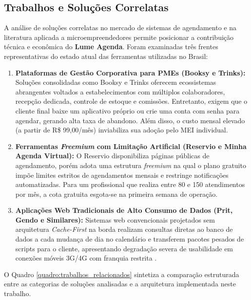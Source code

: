\documentclass[12pt,a4paper]{article}
\begin{document}

\subsection{Trabalhos e Soluções Correlatas}
\label{subsec:trabalhos_correlatos}

A análise de soluções correlatas no mercado de sistemas de agendamento e na literatura aplicada a microempreendedores permite posicionar a contribuição técnica e econômica do \textbf{Lume Agenda}. Foram examinadas três frentes representativas do estado atual das ferramentas utilizadas no Brasil:

\begin{enumerate}
    \item \textbf{Plataformas de Gestão Corporativa para PMEs (Booksy e Trinks):} Soluções consolidadas como Booksy \cite{booksy_br, booksy_pricing} e Trinks \cite{trinks_planos, trinks_home} oferecem ecossistemas abrangentes voltados a estabelecimentos com múltiplos colaboradores, recepção dedicada, controle de estoque e comissões. Entretanto, exigem que o cliente final baixe um aplicativo próprio ou crie uma conta com senha para agendar, gerando alta taxa de abandono. Além disso, o custo mensal elevado (a partir de R\$ 99,00/mês) inviabiliza sua adoção pelo MEI individual.
    \item \textbf{Ferramentas \textit{Freemium} com Limitação Artificial (Reservio e Minha Agenda Virtual):} O Reservio \cite{reservio_br, reservio_pt} disponibiliza páginas públicas de agendamento, porém adota uma estrutura \textit{freemium} na qual o plano gratuito impõe limites estritos de agendamentos mensais e restringe notificações automatizadas. Para um profissional que realiza entre 80 e 150 atendimentos por mês, a cota gratuita esgota-se na primeira semana de operação.
    \item \textbf{Aplicações Web Tradicionais de Alto Consumo de Dados (Prit, Gendo e Similares):} Sistemas web convencionais projetados sem arquitetura \textit{Cache-First} na borda realizam consultas diretas ao banco de dados a cada mudança de dia no calendário e transferem pacotes pesados de scripts para o cliente, apresentando degradação severa de usabilidade em conexões móveis 3G/4G com franquia restrita \cite{cetic_tic_domicilios_2024}.
\end{enumerate}

O Quadro \ref{quadro:trabalhos_relacionados} sintetiza a comparação estruturada entre as categorias de soluções analisadas e a arquitetura implementada neste trabalho.
\end{document}
